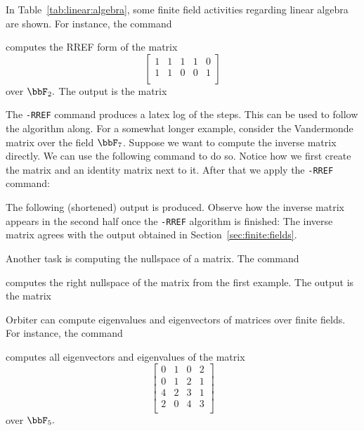 In Table~\ref{tab:linear:algebra}, 
some finite field activities regarding linear algebra are shown.
For instance, the command


computes the RREF form of the 
matrix 
$$
\left[
\begin{array}{ccccc}
1&1&1&1&0\\
1&1&0&0&1\\
\end{array}
\right]
$$
over $\bbF_2.$
The output is the matrix 

\bigskip

The \verb'-RREF' command produces a latex log of the steps. 
This can be used to follow the algorithm along. 
For a somewhat longer example, 
consider the Vandermonde matrix over the field $\bbF_7$.
Suppose we want to compute the inverse matrix directly. 
We can use the following command to do so. 
Notice how we first create the matrix and an identity matrix next to it. 
After that we apply the \verb'-RREF' command:




The following (shortened) output is produced. 
Observe how the inverse matrix 
appears in the second half once the \verb'-RREF' algorithm is finished: 
The inverse matrix agrees with the output 
obtained in Section~\ref{sec:finite:fields}.



\bigskip


Another task is computing the nullspace of a matrix.
The command 


computes the right nullspace of the matrix from the first example.
The output is the matrix

\bigskip


Orbiter can compute eigenvalues 
and eigenvectors of matrices over finite fields. 
For instance, the command 


computes all eigenvectors and eigenvalues of the matrix
$$
\left[
\begin{array}{cccc}
	0&1&0&2\\
	0&1&2&1\\
	4&2&3&1\\
	2&0&4&3\\
\end{array}
\right]
$$
over $\bbF_5.$

